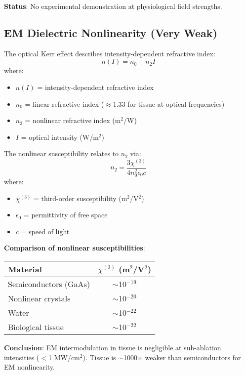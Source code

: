 \textbf{Status}: No experimental demonstration at physiological field strengths.

\subsection{EM Dielectric Nonlinearity (Very Weak)}

The optical Kerr effect describes intensity-dependent refractive index:
\begin{equation}
\label{eq:kerr-effect}
n(I) = n_0 + n_2 I
\end{equation}
where:
\begin{itemize}
\item $n(I)$ = intensity-dependent refractive index
\item $n_0$ = linear refractive index ($\approx$1.33 for tissue at optical frequencies)
\item $n_2$ = nonlinear refractive index (m$^2$/W)
\item $I$ = optical intensity (W/m$^2$)
\end{itemize}

The nonlinear susceptibility relates to $n_2$ via:
\begin{equation}
\label{eq:chi3-relation}
n_2 = \frac{3\chi^{(3)}}{4n_0^2\epsilon_0 c}
\end{equation}
where:
\begin{itemize}
\item $\chi^{(3)}$ = third-order susceptibility (m$^2$/V$^2$)
\item $\epsilon_0$ = permittivity of free space
\item $c$ = speed of light
\end{itemize}

\textbf{Comparison of nonlinear susceptibilities}:
\begin{center}
\begin{tabular}{lc}
\toprule
Material & $\chi^{(3)}$ (m$^2$/V$^2$) \\
\midrule
Semiconductors (GaAs) & $\sim$10$^{-19}$ \\
Nonlinear crystals & $\sim$10$^{-20}$ \\
Water & $\sim$10$^{-22}$ \\
Biological tissue & $\sim$10$^{-22}$ \\
\bottomrule
\end{tabular}
\end{center}

\textbf{Conclusion}: EM intermodulation in tissue is negligible at sub-ablation intensities ($<$1 MW/cm$^2$). Tissue is $\sim$1000$\times$ weaker than semiconductors for EM nonlinearity.

